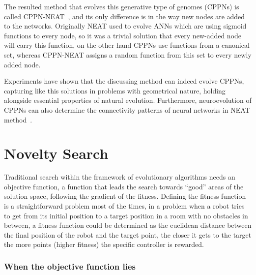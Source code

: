 The resulted method that evolves this generative type of genomes (CPPNs) is called CPPN-NEAT~\cite{stanley2007compositional}, and its only difference is in the way new nodes are added to the networks. Originally NEAT used to evolve ANNs which are using sigmoid functions to every node, so it was a trivial solution that every new-added node will carry this function, on the other hand CPPNs use functions from a canonical set, whereas CPPN-NEAT assigns a random function from this set to every newly added node.

Experiments have shown that the discussing method can indeed evolve CPPNs, capturing like this solutions in problems with geometrical nature, holding alongside essential properties of natural evolution. Furthermore, neuroevolution of CPPNs can also determine the connectivity patterns of neural networks in NEAT method~\cite{stanley2009hypercube}.




\section{Novelty Search}

Traditional search within the framework of evolutionary algorithms needs an objective function, a function that leads the search towards ``good'' areas of the solution space, following the gradient of the fitness. Defining the fitness function is a straightforward problem most of the times, in a problem when a robot tries to get from its initial position to a target position in a room with no obstacles in between, a fitness function could be determined as the euclidean distance between the final position of the robot and the target point, the closer it gets to the target the more points (higher fitness) the specific controller is rewarded.

\subsubsection*{When the objective function lies}

